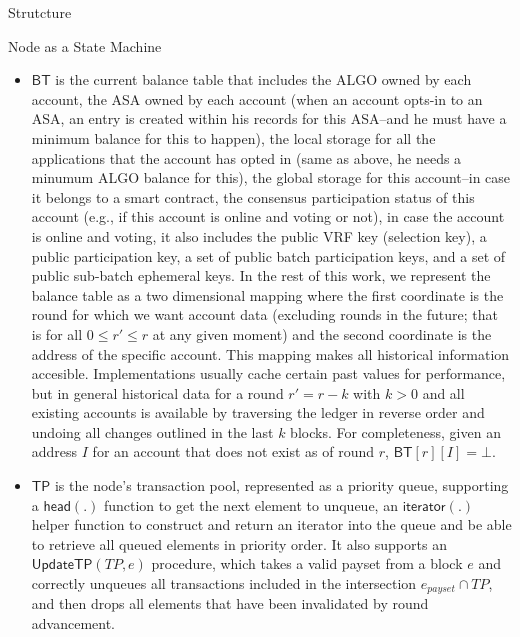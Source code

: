 \documentclass[10pt,a4paper]{article}
\begin{document}
\begin{section}{Strutcture}
\begin{subsection}{Node as a State Machine}
\begin{itemize}
    \item
    $\mathsf{BT}$ is the current balance table  that includes 
      the ALGO owned by each account, 
      the ASA owned by each account (when an account opts-in to an ASA, an entry is created within his records for
        this ASA--and he must have a minimum balance for this to happen),
      the local storage for all the applications that the account has opted in (same as above, he needs a minumum
        ALGO balance for this),
      the global storage for this account--in case it belongs to a smart contract,
      the consensus participation status of this account (e.g., if this account is online and voting or not),
      in case the account is online and voting, it also includes
        the public VRF key (selection key),
        a public participation key, 
        a set of public batch participation keys, 
        and a set of public sub-batch ephemeral keys.
        In the rest of this work, we represent the balance table as a two dimensional mapping where the
        first coordinate is the round for which we want account data (excluding rounds in the future; that
        is for all $0 \leq r\prime \leq r$ at any given moment)
        and the second coordinate is the address of the specific account.
        This mapping makes all historical information accesible. Implementations usually cache certain past
        values for performance, but in general historical data for a round $r\prime = r-k$ with $k>0$ and all 
        existing accounts is available by traversing the ledger in reverse order and undoing all changes outlined 
        in the last $k$ blocks.
        For completeness, given an address $I$ for an account that does not exist as of round $r$,
        $\mathsf{BT}[r][I] = \bot$.

    \item
    $\mathsf{TP}$ is the node's transaction pool, represented as a priority queue, supporting
    a $\mathsf{head(.)}$ function to get the next element to unqueue, an $\mathsf{iterator}(.)$
    helper function to construct and return an iterator into the queue and be able to retrieve all
    queued elements in priority order.
    It also supports an $\mathsf{UpdateTP}(TP,e)$ procedure, which takes a valid payset from a block $e$
    and correctly unqueues all transactions included in the intersection $e_{payset} \cap TP$, and then
    drops all elements that have been invalidated by round advancement.


\end{itemize}
\end{subsection}
\end{section}
\end{document}
